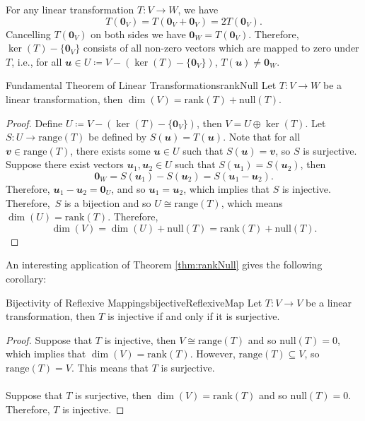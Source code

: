 \documentclass[math, code]{amznotes}
\theoremstyle{remark}
\newcommand{\zero}{\mathbf{0}}
\begin{document}
For any linear transformation $T \colon V \to W$, we have 
\begin{equation*}
    T(\zero_V) = T(\zero_V + \zero_V) = 2T(\zero_V).
\end{equation*}
Cancelling $T(\zero_V)$ on both sides we have $\zero_W = T(\zero_V)$. Therefore, $\ker(T) - \{\zero_V\}$ consists of all non-zero vectors which are mapped to zero under $T$, i.e., for all $\mathbfit{u} \in U \coloneqq V - (\ker(T) - \{\zero_V\})$, $T(\mathbfit{u}) \neq \zero_W$. 
\begin{thmbox}{Fundamental Theorem of Linear Transformations}{rankNull}
    Let $T \colon V \to W$ be a linear transformation, then $\dim(V) = \mathrm{rank}(T) + \mathrm{null}(T)$.
    \tcblower
    \begin{proof}
        Define $U \coloneqq V - (\ker(T) - \{\zero_V\})$, then $V = U \oplus \ker(T)$. Let $S \colon U \to \mathrm{range}(T)$ be defined by $S(\mathbfit{u}) = T(\mathbfit{u})$. Note that for all $\mathbfit{v} \in \mathrm{range}(T)$, there exists some $\mathbfit{u} \in U$ such that $S(\mathbfit{u}) = \mathbfit{v}$, so $S$ is surjective. Suppose there exist vectors $\mathbfit{u}_1, \mathbfit{u}_2 \in U$ such that $S(\mathbfit{u}_1) = S(\mathbfit{u}_2)$, then
        \begin{equation*}
            \zero_W = S(\mathbfit{u}_1) - S(\mathbfit{u}_2) = S(\mathbfit{u}_1 - \mathbfit{u}_2).
        \end{equation*}
        Therefore, $\mathbfit{u}_1 - \mathbfit{u}_2 = \zero_U$, and so $\mathbfit{u}_1 = \mathbfit{u}_2$, which implies that $S$ is injective. Therefore,~$S$ is a bijection and so $U \cong \mathrm{range}(T)$, which means $\dim(U) = \mathrm{rank}(T)$. Therefore,
        \begin{equation*}
            \dim(V) = \dim(U) + \mathrm{null}(T) = \mathrm{rank}(T) + \mathrm{null}(T).
        \end{equation*}
    \end{proof}
\end{thmbox}
An interesting application of Theorem \ref{thm:rankNull} gives the following corollary:
\begin{corbox}{Bijectivity of Reflexive Mappings}{bijectiveReflexiveMap}
    Let $T \colon V \to V$ be a linear transformation, then $T$ is injective if and only if it is surjective.
    \tcblower
    \begin{proof}
        Suppose that $T$ is injective, then $V \cong \mathrm{range}(T)$ and so $\mathrm{null}(T) = 0$, which implies that $\dim(V) = \mathrm{rank}(T)$. However, $\mathrm{range}(T) \subseteq V$, so $\mathrm{range}(T) = V$. This means that $T$ is surjective.
        \\\\
        Suppose that $T$ is surjective, then $\dim(V) = \mathrm{rank}(T)$ and so $\mathrm{null}(T) = 0$. Therefore, $T$ is injective.
    \end{proof}
\end{corbox}
\end{document}

